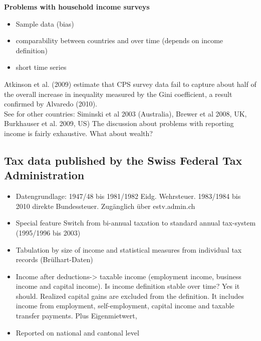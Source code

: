 \documentclass[twoside]{article}\usepackage[]{graphicx}\usepackage[]{color}
\begin{document}
\begin{multicols}{2}
\textbf{Problems with household income surveys}
\begin{itemize}
\item Sample data (bias)
\item comparability between countries and over time (depends on income definition)
\item short time series
\end{itemize}

Atkinson et al. (2009) estimate that CPS survey data fail to capture about half of the overall increase in inequality measured by the Gini coefficient, a result confirmed by Alvaredo (2010). \\

See for other countries: Siminski et al 2003 (Australia), Brewer et al 2008, UK, Burkhauser et al. 2009, US)
The discussion about problems with reporting income is fairly exhaustive. What about wealth?


\subsection{Tax data published by the Swiss Federal Tax Administration}

\begin{itemize}
\item	Datengrundlage: 1947/48 bis 1981/1982 Eidg. Wehrsteuer. 1983/1984 bis 2010 direkte Bundessteuer. Zugänglich über estv.admin.ch
	\item	Special feature Switch from bi-annual taxation to standard annual tax-system (1995/1996 bis 2003)
	\item	Tabulation by size of income and statistical measures from individual tax records (Brülhart-Daten)
	\item	Income after deductions-> taxable income (employment income, business income and capital income). Is income definition stable over time? Yes it should. Realized capital gains are excluded from the definition. It includes income from  employment, self-employment, capital income and taxable transfer payments. Plus Eigenmietwert, 
	\item	Reported on national and cantonal level
\end{itemize}


\end{multicols}
\end{document}
